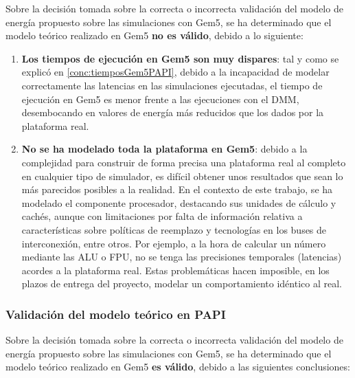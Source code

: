 Sobre la decisión tomada sobre la correcta o incorrecta validación del modelo de energía propuesto sobre las simulaciones con Gem5, se ha determinado que el modelo teórico realizado en Gem5 \textbf{no es válido}, debido a lo siguiente:

\begin{enumerate}%
    \item \textbf{Los tiempos de ejecución en Gem5 son muy dispares}: tal y como se explicó en \ref{conc:tiemposGem5PAPI}, debido a la incapacidad de modelar correctamente las latencias en las simulaciones ejecutadas, el tiempo de ejecución en Gem5 es menor frente a las ejecuciones con el DMM, desembocando en valores de energía más reducidos que los dados por la plataforma real. 
    \item \textbf{No se ha modelado toda la plataforma en Gem5}: debido a la complejidad para construir de forma precisa una plataforma real al completo en cualquier tipo de simulador, es difícil obtener unos resultados que sean lo más parecidos posibles a la realidad. En el contexto de este trabajo, se ha modelado el componente procesador, destacando sus unidades de cálculo y cachés, aunque con limitaciones por falta de información relativa a características sobre políticas de reemplazo y tecnologías en los buses de interconexión, entre otros. Por ejemplo, a la hora de calcular un número mediante las \ac{ALU} o \ac{FPU}, no se tenga las precisiones temporales (latencias) acordes a la plataforma real. Estas problemáticas hacen imposible, en los plazos de entrega del proyecto, modelar un comportamiento idéntico al real. 
\end{enumerate}

\subsubsection{Validación del modelo teórico en PAPI}
\label{papi-vs-dmm}

Sobre la decisión tomada sobre la correcta o incorrecta validación del modelo de energía propuesto sobre las simulaciones con Gem5, se ha determinado que el modelo teórico realizado en Gem5 \textbf{es válido}, debido a las siguientes conclusiones:

